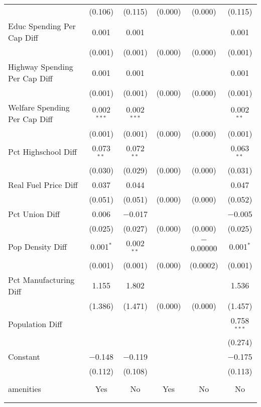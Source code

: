 \begin{table}[!htbp]
\begin{tabular}{@{\extracolsep{5pt}}lccccc}
  & (0.106) & (0.115) & (0.000) & (0.000) & (0.115) \\ 
  Educ Spending Per Cap Diff & 0.001 & 0.001 &  &  & 0.001 \\ 
  & (0.001) & (0.001) & (0.000) & (0.000) & (0.001) \\ 
  Highway Spending Per Cap Diff & 0.001 & 0.001 &  &  & 0.001 \\ 
  & (0.001) & (0.001) & (0.000) & (0.000) & (0.001) \\ 
  Welfare Spending Per Cap Diff & 0.002$^{***}$ & 0.002$^{***}$ &  &  & 0.002$^{**}$ \\ 
  & (0.001) & (0.001) & (0.000) & (0.000) & (0.001) \\ 
  Pct Highschool Diff & 0.073$^{**}$ & 0.072$^{**}$ &  &  & 0.063$^{**}$ \\ 
  & (0.030) & (0.029) & (0.000) & (0.000) & (0.031) \\ 
  Real Fuel Price Diff & 0.037 & 0.044 &  &  & 0.047 \\ 
  & (0.051) & (0.051) & (0.000) & (0.000) & (0.052) \\ 
  Pct Union Diff & 0.006 & $-$0.017 &  &  & $-$0.005 \\ 
  & (0.025) & (0.027) & (0.000) & (0.000) & (0.025) \\ 
  Pop Density Diff & 0.001$^{*}$ & 0.002$^{**}$ &  & $-$0.00000 & 0.001$^{*}$ \\ 
  & (0.001) & (0.001) & (0.000) & (0.0002) & (0.001) \\ 
  Pct Manufacturing Diff & 1.155 & 1.802 &  &  & 1.536 \\ 
  & (1.386) & (1.471) & (0.000) & (0.000) & (1.457) \\ 
  Population Diff &  &  &  &  & 0.758$^{***}$ \\ 
  &  &  &  &  & (0.274) \\ 
  Constant & $-$0.148 & $-$0.119 &  &  & $-$0.175 \\ 
  & (0.112) & (0.108) &  &  & (0.113) \\ 
 \hline \\[-1.8ex] 
amenities & Yes & No & Yes & No & No \\ 
\hline \\[-1.8ex] 
\hline 
\hline \\[-1.8ex] 
\end{tabular} 
\end{table} 
